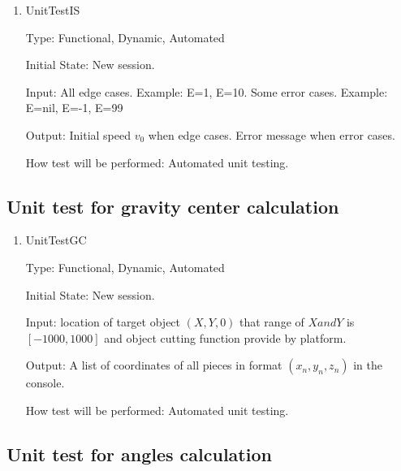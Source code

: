 \documentclass[12pt, titlepage]{article}
\begin{document}
\begin{enumerate}
	
	\item{UnitTestIS\\}
	
	Type: Functional, Dynamic, Automated
	
	Initial State: New session.
	
	Input: All edge cases. Example: E=1, E=10.
		Some error cases. Example: E=nil, E=-1, E=99
	
	Output: Initial speed $v_{0}$ when edge cases.
			Error message when error cases.
	
	How test will be performed: Automated unit testing.
	
\end{enumerate}

\subsection{Unit test for gravity center calculation}

\begin{enumerate}
	
	\item{UnitTestGC\\}
	
	Type: Functional, Dynamic, Automated
	
	Initial State: New session.
	
	Input: location of target object $(X,Y,0)$ that range of $X and Y$ is $[-1000,1000]$ and object cutting function provide by platform. 
	
	Output: A list of coordinates of all pieces in format $(x_{n},y_{n},z_{n})$ in the console.
	
	How test will be performed: Automated unit testing.
	
\end{enumerate}

\subsection{Unit test for angles calculation}
\end{document}
